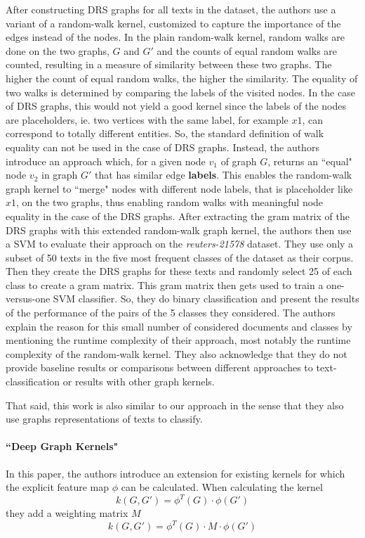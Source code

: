 After constructing DRS graphs for all texts in the dataset, the authors use a variant of a random-walk kernel, customized to capture the importance of the edges instead of the nodes.
In the plain random-walk kernel, random walks are done on the two graphs, $G$ and $G'$ and the counts of equal random walks are counted, resulting in a measure of similarity between these two graphs. The higher the count of equal random walks, the higher the similarity.
The equality of two walks is determined by comparing the labels of the visited nodes.
In the case of DRS graphs, this would not yield a good kernel since the labels of the nodes are placeholders, ie. two vertices with the same label, for example $x1$, can correspond to totally different entities.
So, the standard definition of walk equality can not be used in the case of DRS graphs.
Instead, the authors introduce an approach which, for a given node $v_1$ of graph $G$, returns an ``equal" node $v_2$ in graph $G'$ that has similar edge \textbf{labels}.
This enables the random-walk graph kernel to ``merge" nodes with different node labels, that is placeholder like $x1$, on the two graphs, thus enabling random walks with meaningful node equality in the case of the DRS graphs.
After extracting the gram matrix of the DRS graphs with this extended random-walk graph kernel, the authors then use a SVM to evaluate their approach on the \textit{reuters-21578} dataset.
They use only a subset of 50 texts in the five most frequent classes of the dataset as their corpus. Then they create the DRS graphs for these texts and randomly select 25 of each class to create a gram matrix.
This gram matrix then gets used to train a one-versus-one SVM classifier. So, they do binary classification and present the results of the performance of the pairs of the 5 classes they considered.
The authors explain the reason for this small number of considered documents and classes by mentioning the runtime complexity of their approach, most notably the runtime complexity of the random-walk kernel.
They also acknowledge that they do not provide baseline results or comparisons between different approaches to text-classification or results with other graph kernels.

That said, this work is also similar to our approach in the sense that they also use graphs representations of texts to classify.

\paragraph{``Deep Graph Kernels" \cite{Yanardag2015}}
In this paper, the authors introduce an extension for existing kernels for which the explicit feature map $\phi$ can be calculated.
When calculating the kernel
\begin{equation*}
k(G, G') = \phi^T(G) \cdot \phi(G')
\end{equation*}
they add a weighting matrix $M$
\begin{equation*}
k(G, G') = \phi^T(G) \cdot M \cdot \phi(G')
\end{equation*}

